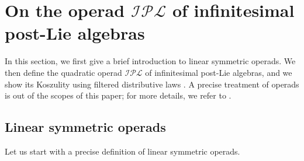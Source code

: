 \documentclass[10pt]{article}
\theoremstyle{definition}
\begin{document}
\section{On the operad $\mathcal{IPL}$ of infinitesimal post-Lie algebras}\label{sec:operad}
In this section, we first give a brief introduction to linear symmetric operads. We then define the quadratic operad $\mathcal{IPL}$ of infinitesimal post-Lie algebras, and we show its Koszulity using filtered distributive laws \cite{DG}. A precise treatment of operads is out of the scopes of this paper; for more details, we refer to \cite{MSS,LodayVallette,Felicia}.
\subsection{Linear symmetric operads}
Let us start with a precise definition of linear symmetric operads. 
\end{document}
